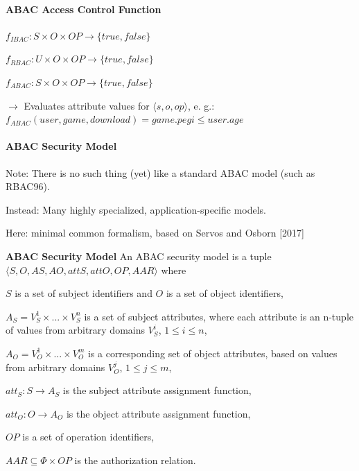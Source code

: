 \documentclass[a4paper]{article}
\renewcommand{\note}[2]{\begin{noteBox} \textbf{#1} #2 \end{noteBox}}
\begin{document}
\begin{multicols}{3}
    \paragraph{ABAC Access Control Function}
    \begin{itemize*}
        \item $f_{IBAC}:S\times O\times OP\rightarrow\{true,false\}$
        \item $f_{RBAC}:U\times O\times OP\rightarrow\{true,false\}$
        \item $f_{ABAC}:S\times O\times OP\rightarrow\{true,false\}$
        \item $\rightarrow$ Evaluates attribute values for $⟨s,o,op⟩$, e. g.: $f_{ABAC}(user,game,download)=game.pegi \leq user.age$
    \end{itemize*}

    \paragraph{ABAC Security Model}
    \begin{itemize*}
        \item Note: There is no such thing (yet) like a standard ABAC model (such as RBAC96).
        \item Instead: Many highly specialized, application-specific models.
        \item Here: minimal common formalism, based on Servos and Osborn [2017]
    \end{itemize*}

    \note{ABAC Security Model}{An ABAC security model is a tuple $⟨S,O,AS,AO,attS,attO,OP,AAR⟩$ where
        \begin{itemize*}
            \item $S$ is a set of subject identifiers and $O$ is a set of object identifiers,
            \item $A_S=V_S^1 \times...\times V_S^n$ is a set of subject attributes, where each attribute is an n-tuple of values from arbitrary domains $V_S^i$, $1\leq i \leq n$,
            \item $A_O=V_O^1\times...\times V_O^m$ is a corresponding set of object attributes, based on values from arbitrary domains $V_O^j$, $1\leq j \leq m$,
            \item $att_S:S\rightarrow A_S$ is the subject attribute assignment function,
            \item $att_O:O\rightarrow A_O$ is the object attribute assignment function,
            \item $OP$ is a set of operation identifiers,
            \item $AAR\subseteq \Phi\times OP$ is the authorization relation.
        \end{itemize*}
    }


\end{multicols}
\end{document}
